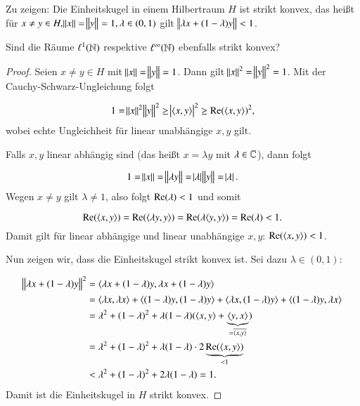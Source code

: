 
\begin{exercise}
  Zu zeigen: Die Einheitskugel in einem Hilbertraum $H$ ist strikt konvex, das heißt für $x \neq y \in H, \norm{x}=\norm{y}=1, \lambda \in (0,1)$ gilt $\norm{\lambda x + (1-\lambda) y} < 1$.

  Sind die Räume $\ell^1(\mathbb{N})$ respektive $\ell^\infty(\mathbb{N})$ ebenfalls strikt konvex?
\end{exercise}
\begin{proof}
  Seien $x \neq y \in H$ mit $\norm{x}=\norm{y}=1$. Dann gilt $\norm{x}^2=\norm{y}^2=1$. Mit der Cauchy-Schwarz-Ungleichung folgt

  \begin{equation*}
    1=\norm{x}^2\norm{y}^2
    \geq \abs{\langle {x},{y} \rangle}^2
    \geq \mathrm{Re}(\langle {x},{y} \rangle)^2,
  \end{equation*}
  wobei echte Ungleichheit für linear unabhängige $x,y$ gilt.

  Falls $x,y$ linear abhängig sind (das heißt $x=\lambda y$ mit $\lambda \in \mathbb{C}$), dann folgt

  \begin{equation*}
    1=\norm{x}=\norm{\lambda y}=\abs{\lambda}\norm{y}=\abs{\lambda}.
  \end{equation*}
  Wegen $x \neq y$ gilt $\lambda \neq 1$, also folgt $\mathrm{Re}(\lambda)<1$ und somit

  \begin{equation*}
    \mathrm{Re}(\langle {x},{y} \rangle)=\mathrm{Re}(\langle {\lambda y},{y} \rangle)=\mathrm{Re}(\lambda \langle {y},{y} \rangle)=\mathrm{Re}(\lambda)<1.
  \end{equation*}
  Damit gilt für linear abhängige und linear unabhängige $x,y$: $\mathrm{Re}(\langle {x},{y} \rangle) < 1$.

  Nun zeigen wir, dass die Einheitskugel strikt konvex ist. Sei dazu $\lambda \in (0,1)$:

  \begin{equation*}
    \begin{split}
      \norm{\lambda x + (1-\lambda) y}^2
      &= \langle {\lambda x + (1-\lambda)y},{\lambda x + (1-\lambda)y} \rangle \\
      &= \langle {\lambda x},{\lambda x} \rangle+ \langle {(1-\lambda)y},{(1-\lambda)y} \rangle + \langle {\lambda x},{(1-\lambda)y} \rangle + \langle {(1-\lambda)y},{\lambda x} \rangle \\
      &= \lambda^2 + (1-\lambda)^2 + \lambda(1-\lambda)(\langle {x},{y} \rangle + \underbrace{\langle {y},{x} \rangle}_{=\overline{\langle {x},{y} \rangle}}) \\
      &= \lambda^2 + (1-\lambda)^2 + \lambda(1-\lambda)\cdot 2\underbrace{\mathrm{Re}(\langle {x},{y} \rangle)}_{< 1} \\
      &< \lambda^2 + (1-\lambda)^2 + 2\lambda(1-\lambda)= 1.
    \end{split}
  \end{equation*}
  Damit ist die Einheitskugel in $H$ strikt konvex.


\end{proof}

